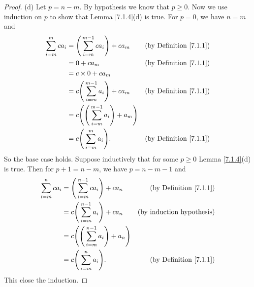 \begin{proof}{(d)}
    Let \(p = n - m\).
    By hypothesis we know that \(p \geq 0\).
    Now we use induction on \(p\) to show that Lemma \ref{7.1.4}(d) is true.
    For \(p = 0\), we have \(n = m\) and
    \begin{align*}
        \sum_{i = m}^m ca_i & = \Bigg(\sum_{i = m}^{m - 1} ca_i\Bigg) + ca_m             & \text{(by Definition \ref{7.1.1})} \\
                            & = 0 + ca_m                                                 & \text{(by Definition \ref{7.1.1})} \\
                            & = c \times 0 + ca_m                                                                             \\
                            & = c \Bigg(\sum_{i = m}^{m - 1} a_i\Bigg) + ca_m            & \text{(by Definition \ref{7.1.1})} \\
                            & = c \Bigg(\Bigg(\sum_{i = m}^{m - 1} a_i\Bigg) + a_m\Bigg)                                      \\
                            & = c \Bigg(\sum_{i = m}^m a_i\Bigg).                        & \text{(by Definition \ref{7.1.1})}
    \end{align*}
    So the base case holds.
    Suppose inductively that for some \(p \geq 0\) Lemma \ref{7.1.4}(d) is true.
    Then for \(p + 1 = n - m\), we have \(p = n - m - 1\) and
    \begin{align*}
        \sum_{i = m}^n ca_i & = \Bigg(\sum_{i = m}^{n - 1} ca_i\Bigg) + ca_n             & \text{(by Definition \ref{7.1.1})} \\
                            & = c \Bigg(\sum_{i = m}^{n - 1} a_i\Bigg) + ca_n            & \text{(by induction hypothesis)}   \\
                            & = c \Bigg(\Bigg(\sum_{i = m}^{n - 1} a_i\Bigg) + a_n\Bigg)                                      \\
                            & = c \Bigg(\sum_{i = m}^n a_i\Bigg).                        & \text{(by Definition \ref{7.1.1})}
    \end{align*}
    This close the induction.
\end{proof}

